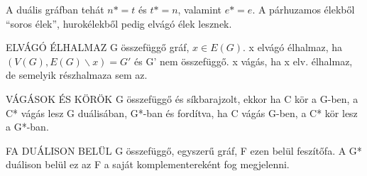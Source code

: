 A duális gráfban tehát $n* = t$ és $t* = n$, valamint $e* = e$.
A párhuzamos élekből ``soros élek'', hurokélekből pedig elvágó élek lesznek.

\begin{definicio}{ELVÁGÓ ÉLHALMAZ}
G összefüggő gráf, $x \in E(G)$. x elvágó élhalmaz, ha $(V(G),E(G)\backslash x) = G'$ és G' nem összefüggő. x vágás, ha x elv. élhalmaz, de semelyik részhalmaza sem az.
\end{definicio}

\begin{tetel}{VÁGÁSOK ÉS KÖRÖK}
G összefüggő és síkbarajzolt, ekkor ha C kör a G-ben, a C* vágás lesz G duálisában, G*-ban és fordítva, ha C vágás G-ben, a C* kör lesz a G*-ban.
\end{tetel}

\begin{tetel}{FA DUÁLISON BELÜL}
G összefüggő, egyszerű gráf, F ezen belül feszítőfa. A G* duálison belül ez az F a saját komplementereként fog megjelenni.
\end{tetel}

